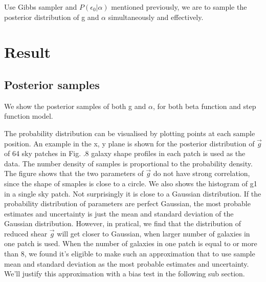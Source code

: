 \documentclass[useAMS,usenatbib]{mn2e}
\begin{document}
Use Gibbs sampler and $P(\epsilon_{0}|\alpha)$ mentioned previously, we
are to sample the posterior distribution of g and $\alpha$ simultaneously
and effectively.




\section{Result}

\label{sec:XXX}


\subsection{Posterior samples}

We show the posterior samples of both g and $\alpha$, for both beta
function and step function model. 

The probability distribution can be visualised by plotting points at each sample
position. An example in the x, y plane is shown for the posterior distribution of
$\vec{g}$ of 64 sky patches in Fig. .8 galaxy shape profiles in each patch is used as the data.
The number density of samples is proportional to the probability density. The figure shows that the two parameters of $\vec{g}$
do not have strong correlation, since the shape of smaples is close to a circle.
We also shows the histogram of g1 in a single sky patch. Not surprisingly it is close to a Gaussian distribution.
If the probability distribution of parameters are perfect Gaussian, the most probable estimates and uncertainty 
is just the mean and standard deviation of the Gaussian distribution. However, in pratical, we find that the distribution 
of reduced shear $\vec{g}$ will  get closer to Gaussian, when larger number of galaxies in one patch  is used. When the number of galaxies in 
one patch is equal to or more than 8, we found it's eligible to make such an approximation that to use sample mean and standard 
deviation as the most probable estimates and uncertainty. We'll justify this approximation with a bias test in the following
sub section.
\end{document}
